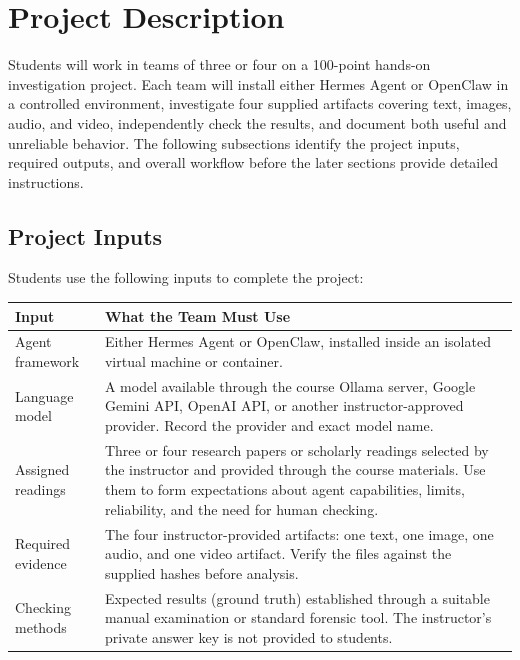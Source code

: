 \documentclass[12pt,letterpaper]{article}
\begin{document}
\section{Project Description}
Students will work in teams of three or four on a 100-point hands-on investigation project. Each team will install either Hermes Agent or OpenClaw in a controlled environment, investigate four supplied artifacts covering text, images, audio, and video, independently check the results, and document both useful and unreliable behavior. The following subsections identify the project inputs, required outputs, and overall workflow before the later sections provide detailed instructions.

\subsection{Project Inputs}
Students use the following inputs to complete the project:

\begin{center}
    \small
    \begin{tabular}{|p{}|p{}|}
        \hline
        \textbf{Input}    & \textbf{What the Team Must Use}                                                                                                                                                                                                         \\
        \hline
        Agent framework   & Either Hermes Agent or OpenClaw, installed inside an isolated virtual machine or container.                                                                                                                                             \\
        \hline
        Language model    & A model available through the course Ollama server, Google Gemini API, OpenAI API, or another instructor-approved provider. Record the provider and exact model name.                                                                   \\
        \hline
        Assigned readings & Three or four research papers or scholarly readings selected by the instructor and provided through the course materials. Use them to form expectations about agent capabilities, limits, reliability, and the need for human checking. \\
        \hline
        Required evidence & The four instructor-provided artifacts: one text, one image, one audio, and one video artifact. Verify the files against the supplied hashes before analysis.                                                                           \\
        \hline
        Checking methods  & Expected results (ground truth) established through a suitable manual examination or standard forensic tool. The instructor's private answer key is not provided to students.                                                           \\
        \hline
    \end{tabular}
\end{center}
\end{document}
